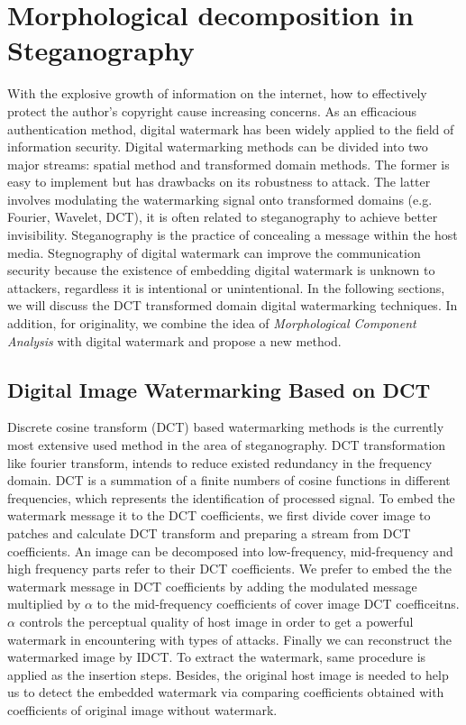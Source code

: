 \section{Morphological decomposition in Steganography}
With the explosive growth of information on the internet, how to effectively protect the author's copyright cause increasing concerns. As an efficacious authentication method, digital watermark has been widely applied to the field of information security. Digital watermarking methods can be divided into two major streams: spatial method and transformed domain methods. The former is easy to implement but has drawbacks on its robustness to attack. The latter involves modulating the watermarking signal onto transformed domains (e.g. Fourier, Wavelet, DCT), it is often related to steganography to achieve better invisibility. Steganography is the practice of concealing a message within the host media. Stegnography of digital watermark can improve the communication security because the existence of embedding digital watermark is unknown to attackers, regardless it is intentional or unintentional. In the following sections, we will discuss the DCT transformed domain digital watermarking techniques. In addition, for originality, we combine the idea of \textit{Morphological Component Analysis} with digital watermark and propose a new method.\\

\subsection{Digital Image Watermarking Based on DCT}
Discrete cosine transform (DCT) based watermarking methods is the currently most extensive used method in the area of steganography. DCT transformation like fourier transform, intends to reduce existed redundancy in the frequency domain. DCT is a summation of a finite numbers of cosine functions in different frequencies, which represents the identification of processed signal. To embed the watermark message it to the DCT coefficients, we first divide cover image to patches and calculate DCT transform and preparing a stream from DCT coefficients. 
An image can be decomposed into low-frequency, mid-frequency and high frequency parts refer to their DCT coefficients. We prefer to embed the the watermark message in DCT coefficients by adding the modulated message multiplied by $\alpha$ to the mid-frequency coefficients of cover image DCT coefficeitns. $\alpha$ controls the perceptual quality of host image in order to get a powerful watermark in encountering with types of attacks. Finally we can reconstruct the watermarked image by IDCT. To extract the watermark, same procedure is applied as the insertion steps. Besides, the original host image is needed to help us to detect the embedded watermark via comparing coefficients obtained with coefficients of original image without watermark. \\


